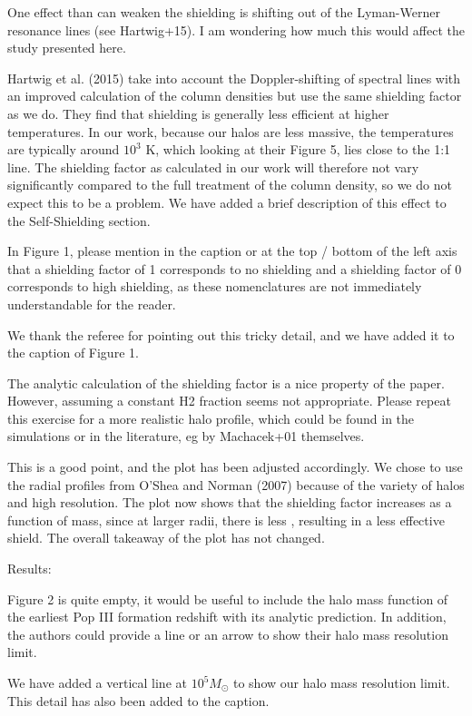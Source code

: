 \documentclass[11pt]{article}
\newenvironment{referee}[1][]{%
    \ignorespaces%
    \begin{mdframed}[style=myquotestyle,#1]%
}{%
    \end{mdframed}%
    \ignorespacesafterend%
}%
\begin{document}
\begin{referee}
One effect than can weaken the shielding is shifting out of the Lyman-Werner resonance lines (see Hartwig+15). I am wondering how much this would affect the study presented here.
\end{referee}
Hartwig et al. (2015) take into account the Doppler-shifting of spectral lines with an improved calculation of the column densities but use the same shielding factor as we do. They find that shielding is generally less efficient at higher temperatures. In our work, because our halos are less massive, the temperatures are typically around $10^{3}$ K, which looking at their Figure 5, lies close to the 1:1 line. The shielding factor as calculated in our work will therefore not vary significantly compared to the full treatment of the column density, so we do not expect this to be a problem.  We have added a brief description of this effect to the \hh{} Self-Shielding section. 

\begin{referee}
In Figure 1, please mention in the caption or at the top / bottom of the left axis that a shielding factor of 1 corresponds to no shielding and a shielding factor of 0 corresponds to high shielding, as these nomenclatures are not immediately understandable for the reader.
\end{referee}
We thank the referee for pointing out this tricky detail, and we have added it to the caption of Figure 1.

\begin{referee}
The analytic calculation of the shielding factor is a nice property of the paper. However, assuming a constant H2 fraction seems not appropriate. Please repeat this exercise for a more realistic halo profile, which could be found in the simulations or in the literature, eg by Machacek+01 themselves.
\end{referee}
This is a good point, and the plot has been adjusted accordingly. We chose to use the \hh{} radial profiles from O'Shea and Norman (2007) because of the variety of halos and high resolution. The plot now shows that the shielding factor increases as a function of mass, since at larger radii, there is less \hh{}, resulting in a less effective \hh{} shield. The overall takeaway of the plot has not changed. 

\begin{referee}
Results:

Figure 2 is quite empty, it would be useful to include the halo mass function of the earliest Pop III formation redshift with its analytic prediction. In addition, the authors could provide a line or an arrow to show their halo mass resolution limit.
\end{referee}
We have added a vertical line at $10^5 M_{\odot}$ to show our halo mass resolution limit. This detail has also been added to the caption.
\end{document}
